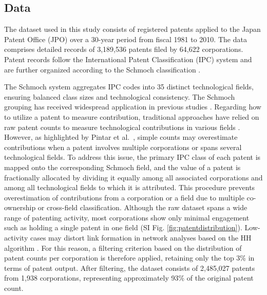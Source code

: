 \subsection*{Data}
{}
\label{subsection:Data}

The dataset used in this study consists of registered patents applied to the Japan Patent Office (JPO) over a 30-year period from fiscal 1981 to 2010. The data comprises detailed records of 3,189,536 patents filed by 64,622 corporations. Patent records follow the International Patent Classification (IPC) system and are further organized according to the Schmoch classification \cite{Schmoch2008}. 

The Schmoch system aggregates IPC codes into 35 distinct technological fields, ensuring balanced class sizes and technological consistency. The Schmoch grouping has received widespread application in previous studies \cite{PintarScherngell2022,Balland2018,Whittle2019}.
Regarding how to utilize a patent to measure contribution, traditional approaches have relied on raw patent counts to measure technological contributions in various fields \cite{Balland2016,Balland2018,PintarScherngell2022,Pinheiro2022,Whittle2019,Jun2023,Abay2024}. However, as highlighted by Pintar et al.\ \cite{PintarScherngell2022}, simple counts may overestimate contributions when a patent involves multiple corporations or spans several technological fields.
To address this issue, the primary IPC class of each patent is mapped onto the corresponding Schmoch field, and the value of a patent is fractionally allocated by dividing it equally among all associated corporations and among all technological fields to which it is attributed. This procedure prevents overestimation of contributions from a corporation or a field due to multiple co-ownership or cross-field classification.
Although the raw dataset spans a wide range of patenting activity, most corporations show only minimal engagement such as holding a single patent in one field (SI Fig. \ref{fig:patentdistribution}). 
Low-activity cases may distort link formation in network analyses based on the HH algorithm \cite{PintarScherngell2022}. 
For this reason, a filtering criterion based on the distribution of patent counts per corporation is therefore applied, retaining only the top 3\% in terms of patent output. After filtering, the dataset consists of 2,485,027 patents from 1,938 corporations, representing approximately 93\% of the original patent count.

